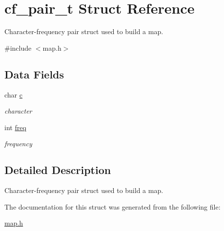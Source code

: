 \hypertarget{structcf__pair__t}{}\section{cf\+\_\+pair\+\_\+t Struct Reference}
\label{structcf__pair__t}


Character-\/frequency pair struct used to build a map.  




{\ttfamily \#include $<$map.\+h$>$}

\subsection*{Data Fields}
\begin{DoxyCompactItemize}
\item 
\hypertarget{structcf__pair__t_a47e5d5decc390a34b5f20219ea8c2732}{}char \hyperlink{structcf__pair__t_a47e5d5decc390a34b5f20219ea8c2732}{c}\label{structcf__pair__t_a47e5d5decc390a34b5f20219ea8c2732}

\begin{DoxyCompactList}\small\item\em character \end{DoxyCompactList}\item 
\hypertarget{structcf__pair__t_a8909645c17ba2edfbef45d907eabdb08}{}int \hyperlink{structcf__pair__t_a8909645c17ba2edfbef45d907eabdb08}{freq}\label{structcf__pair__t_a8909645c17ba2edfbef45d907eabdb08}

\begin{DoxyCompactList}\small\item\em frequency \end{DoxyCompactList}\end{DoxyCompactItemize}


\subsection{Detailed Description}
Character-\/frequency pair struct used to build a map. 

The documentation for this struct was generated from the following file\+:\begin{DoxyCompactItemize}
\item 
\hyperlink{map_8h}{map.\+h}\end{DoxyCompactItemize}
